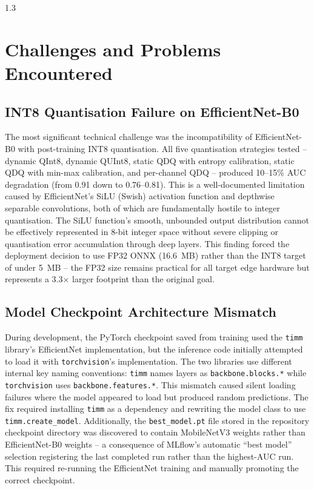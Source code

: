\begin{spacing}{1.3}
\section{Challenges and Problems Encountered}

\subsection{INT8 Quantisation Failure on EfficientNet-B0}

The most significant technical challenge was the incompatibility of EfficientNet-B0 with post-training INT8 quantisation. All five quantisation strategies tested -- dynamic QInt8, dynamic QUInt8, static QDQ with entropy calibration, static QDQ with min-max calibration, and per-channel QDQ -- produced 10--15\% AUC degradation (from 0.91 down to 0.76--0.81). This is a well-documented limitation caused by EfficientNet's SiLU (Swish) activation function and depthwise separable convolutions, both of which are fundamentally hostile to integer quantisation. The SiLU function's smooth, unbounded output distribution cannot be effectively represented in 8-bit integer space without severe clipping or quantisation error accumulation through deep layers. This finding forced the deployment decision to use FP32 ONNX (16.6~MB) rather than the INT8 target of under 5~MB -- the FP32 size remains practical for all target edge hardware but represents a 3.3$\times$ larger footprint than the original goal.

\subsection{Model Checkpoint Architecture Mismatch}

During development, the PyTorch checkpoint saved from training used the \texttt{timm} library's EfficientNet implementation, but the inference code initially attempted to load it with \texttt{torchvision}'s implementation. The two libraries use different internal key naming conventions: \texttt{timm} names layers as \texttt{backbone.blocks.*} while \texttt{torchvision} uses \texttt{backbone.features.*}. This mismatch caused silent loading failures where the model appeared to load but produced random predictions. The fix required installing \texttt{timm} as a dependency and rewriting the model class to use \texttt{timm.create\_model}. Additionally, the \texttt{best\_model.pt} file stored in the repository checkpoint directory was discovered to contain MobileNetV3 weights rather than EfficientNet-B0 weights -- a consequence of MLflow's automatic ``best model'' selection registering the last completed run rather than the highest-AUC run. This required re-running the EfficientNet training and manually promoting the correct checkpoint.


\end{spacing}
